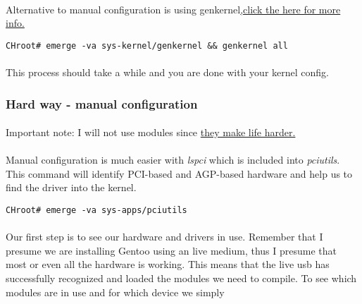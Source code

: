 \documentclass[10pt,a4paper]{article}
\begin{document}
                \paragraph{} Alternative to manual configuration is using genkernel\href{https://wiki.gentoo.org/wiki/Handbook:AMD64/Installation/Kernel#Alternative:_Using_genkernel}{,click the here for more info.}
\begin{lstlisting}[style=BashInputCHRoot]
 CHroot# emerge -va sys-kernel/genkernel && genkernel all
\end{lstlisting}
                
                \paragraph{} This process should take a while and you are done with your kernel config.
                
            \newpage
            \subsubsection{Hard way - manual configuration}
                
                \paragraph{} Important note: I will not use modules since \href{https://wiki.gentoo.org/wiki/Kernel/Gentoo_Kernel_Configuration_Guide#Modules_do_not_get_loaded_automatically}{they make life harder.}
                
                \paragraph{} Manual configuration is much easier with \textit{lspci} which is included into \textit{pciutils}. This command will identify PCI-based and AGP-based hardware and help us to find the driver into the kernel.
                
\begin{lstlisting}[style=BashInputCHRoot]
 CHroot# emerge -va sys-apps/pciutils
\end{lstlisting}
                
                \paragraph{} Our first step is to see our hardware and drivers in use. Remember that I presume we are installing Gentoo using an live medium, thus I presume that most or even all the hardware is working. This means that the live usb has successfully recognized and loaded the modules we need to compile. To see which modules are in use and for which device we simply
\end{document}
